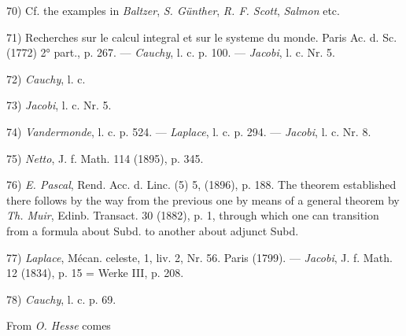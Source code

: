 \vspace{-0.1cm}
\leftline{\rule{2in}{0.4pt}}
\vspace{0.1cm}
{
\footnotesize
70) Cf. the examples in \textit{Baltzer}, \textit{S. Günther}, \textit{R. F. Scott}, \textit{Salmon} etc.

71) Recherches sur le calcul integral et sur le systeme du monde. Paris Ac. d. Sc. (1772) 2° part., p. 267. — \textit{Cauchy}, l. c. p. 100. — \textit{Jacobi}, l. c. Nr. 5.

72) \textit{Cauchy}, l. c.

73) \textit{Jacobi}, l. c. Nr. 5.

74) \textit{Vandermonde}, l. c. p. 524. — \textit{Laplace}, l. c. p. 294. — \textit{Jacobi}, l. c. Nr. 8.

75) \textit{Netto}, J. f. Math. 114 (1895), p. 345.

76) \textit{E. Pascal}, Rend. Acc. d. Linc. (5) 5, (1896), p. 188. The theorem established there follows by the way from the previous one by means of a general theorem by \textit{Th. Muir}, Edinb. Transact. 30 (1882), p. 1, through which one can transition from a formula about Subd. to another about adjunct Subd.

77) \textit{Laplace}, Mécan. celeste, 1, liv. 2, Nr. 56. Paris (1799). — \textit{Jacobi}, J. f. Math. 12 (1834), p. 15 = Werke III, p. 208.

78) \textit{Cauchy}, l. c. p. 69.

}
From \textit{O. Hesse} comes